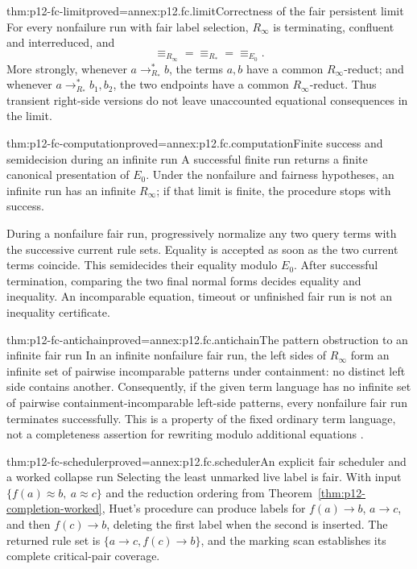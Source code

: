 \begin{hbtheorem}{thm:p12-fc-limit}{proved=annex:p12.fc.limit}{Correctness of the fair persistent limit}
For every nonfailure run with fair label selection, \(R_\infty\)
is terminating, confluent and interreduced, and
\[
 \equiv_{R_\infty}=\equiv_{R_*}=\equiv_{E_0}.
\]
More strongly, whenever \(a\to_{R_*}^*b\), the terms \(a,b\)
have a common \(R_\infty\)-reduct; and whenever
\(a\to_{R_*}^*b_1,b_2\), the two endpoints have a common
\(R_\infty\)-reduct. Thus transient right-side versions do not
leave unaccounted equational consequences in the limit.
\end{hbtheorem}

\begin{hbtheorem}{thm:p12-fc-computation}{proved=annex:p12.fc.computation}{Finite success and semidecision during an infinite run}
A successful finite run returns a finite canonical presentation of
\(E_0\). Under the nonfailure and fairness hypotheses, an infinite
run has an infinite \(R_\infty\); if that limit is finite, the
procedure stops with success.

During a nonfailure fair run, progressively normalize any two query
terms with the successive current rule sets. Equality is accepted as
soon as the two current terms coincide. This semidecides their equality
modulo \(E_0\). After successful termination, comparing the two
final normal forms decides equality and inequality. An incomparable
equation, timeout or unfinished fair run is not an inequality certificate.
\end{hbtheorem}

\begin{hbcorollary}{thm:p12-fc-antichain}{proved=annex:p12.fc.antichain}{The pattern obstruction to an infinite fair run}
In an infinite nonfailure fair run, the left sides of
\(R_\infty\) form an infinite set of pairwise incomparable
patterns under containment: no distinct left side contains another.
Consequently, if the given term language has no infinite set of
pairwise containment-incomparable left-side patterns, every
nonfailure fair run terminates successfully. This is a property of
the fixed ordinary term language, not a completeness assertion for
rewriting modulo additional equations
\cite[p.~19]{Huet1981CompletionCorrectness}.
\end{hbcorollary}

\begin{hbtheorem}{thm:p12-fc-scheduler}{proved=annex:p12.fc.scheduler}{An explicit fair scheduler and a worked collapse run}
Selecting the least unmarked live label is fair. With input
\(\{f(a)\approx b,\ a\approx c\}\) and the reduction ordering
from Theorem~\ref{thm:p12-completion-worked}, Huet's procedure can
produce labels for \(f(a)\to b\), \(a\to c\), and then
\(f(c)\to b\), deleting the first label when the second is inserted.
The returned rule set is \(\{a\to c,f(c)\to b\}\), and the
marking scan establishes its complete critical-pair coverage.
\end{hbtheorem}

